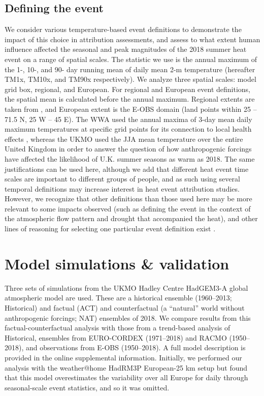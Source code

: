 \subsection{Defining the event}

  We consider various temperature-based event definitions to demonstrate the impact of this choice in attribution assessments, and assess to what extent human influence affected the seasonal and peak magnitudes of the 2018 summer heat event on a range of spatial scales. The statistic we use is the annual maximum of the 1-, 10-, and 90- day running mean of daily mean 2-m temperature (hereafter TM1x, TM10x, and TM90x respectively). We analyze three spatial scales: model grid box, regional, and European. For regional and European event definitions, the spatial mean is calculated before the annual maximum. Regional extents are taken from \citet{christensen_summary_2007}, and European extent is the E-OBS \citep{cornes_ensemble_2018} domain (land points within 25 -- 71.5\textdegree{} N, 25\textdegree{} W -- 45\textdegree{} E). The WWA used the annual maxima of 3-day mean daily maximum temperatures at specific grid points for its connection to local health effects \citep{dippoliti_impact_2010}, whereas the UKMO used the JJA mean temperature over the entire United Kingdom in order to answer the question of how anthropogenic forcings have affected the likelihood of U.K. summer seasons as warm as 2018. The same justifications can be used here, although we add that different heat event time scales are important to different groups of people, and as such using several temporal definitions may increase interest in heat event attribution studies. However, we recognize that other definitions than those used here may be more relevant to some impacts observed (such as defining the event in the context of the atmospheric flow pattern and drought that accompanied the heat), and other lines of reasoning for selecting one particular event definition exist \citep{cattiaux_defining_2018}.

\section{Model simulations \& validation}

  Three sets of simulations from the UKMO Hadley Centre HadGEM3-A global atmospheric model \citep{christidis_new_2013,ciavarella_upgrade_2018} are used. These are a historical ensemble (1960--2013; Historical) and factual (ACT) and counterfactual (a “natural” world without anthropogenic forcings; NAT) ensembles of 2018. We compare results from this factual-counterfactual analysis with those from a trend-based analysis of Historical, ensembles from EURO-CORDEX \citep{vautard_simulation_2013,jacob_euro-cordex_2014,vrac_influence_2017} (1971--2018) and RACMO \citep{aalbers_local-scale_2018,lenderink_preparing_2014} (1950--2018), and observations from E-OBS (1950--2018). A full model description is provided in the online supplemental information. Initially, we performed our analysis with the weather@home HadRM3P European-25 km setup \citep{massey_weatherhome-development_2015} but found that this model overestimates the variability over all Europe for daily through seasonal-scale event statistics, and so it was omitted.

